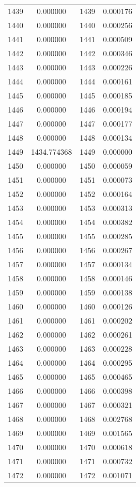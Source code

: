 \documentclass[12pt]{article}
\begin{document}
\begin{longtable}{@{}cccc@{}}
1439 & 0.000000 & 1439 & 0.000176 \\
1440 & 0.000000 & 1440 & 0.000256 \\
1441 & 0.000000 & 1441 & 0.000509 \\
1442 & 0.000000 & 1442 & 0.000346 \\
1443 & 0.000000 & 1443 & 0.000226 \\
1444 & 0.000000 & 1444 & 0.000161 \\
1445 & 0.000000 & 1445 & 0.000185 \\
1446 & 0.000000 & 1446 & 0.000194 \\
1447 & 0.000000 & 1447 & 0.000177 \\
1448 & 0.000000 & 1448 & 0.000134 \\
1449 & 1434.774368 & 1449 & 0.000000 \\
1450 & 0.000000 & 1450 & 0.000059 \\
1451 & 0.000000 & 1451 & 0.000073 \\
1452 & 0.000000 & 1452 & 0.000164 \\
1453 & 0.000000 & 1453 & 0.000313 \\
1454 & 0.000000 & 1454 & 0.000382 \\
1455 & 0.000000 & 1455 & 0.000285 \\
1456 & 0.000000 & 1456 & 0.000267 \\
1457 & 0.000000 & 1457 & 0.000134 \\
1458 & 0.000000 & 1458 & 0.000146 \\
1459 & 0.000000 & 1459 & 0.000138 \\
1460 & 0.000000 & 1460 & 0.000126 \\
1461 & 0.000000 & 1461 & 0.000202 \\
1462 & 0.000000 & 1462 & 0.000261 \\
1463 & 0.000000 & 1463 & 0.000228 \\
1464 & 0.000000 & 1464 & 0.000295 \\
1465 & 0.000000 & 1465 & 0.000465 \\
1466 & 0.000000 & 1466 & 0.000398 \\
1467 & 0.000000 & 1467 & 0.000321 \\
1468 & 0.000000 & 1468 & 0.002768 \\
1469 & 0.000000 & 1469 & 0.001565 \\
1470 & 0.000000 & 1470 & 0.000618 \\
1471 & 0.000000 & 1471 & 0.000732 \\
1472 & 0.000000 & 1472 & 0.001071 \\

\end{longtable}
\end{document}
